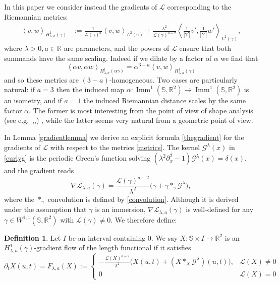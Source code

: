 \documentclass[a4paper,11pt]{amsart}
\theoremstyle{definition}\newtheorem*{definition}{Definition}
\theoremstyle{definition} \newtheorem{proposition}[theorem]{Proposition}
\theoremstyle{definition}\newtheorem{lemma}[theorem]{Lemma}
\theoremstyle{definition}\newtheorem{corollary}[theorem]{Corollary}
\theoremstyle{definition}\newtheorem{example}{Example}
\theoremstyle{remark}\newtheorem*{remark}{Remark}
\newcommand{\IM}{\imm^{1}(\S,\R^2)}
\def\R{\mathbb{R}}
\def\S{\mathbb{S}}
\newcommand{\ip}[1]{{\left \langle {#1} \right \rangle}}
\newcommand{\abs}[1]{\left | {#1}\right |}
\DeclareMathOperator{\imm}{Imm}
\def\length{\mathcal L}
\renewcommand{\L}{\length}
\begin{document}
In this paper we consider instead the gradients of $\length$ corresponding to the Riemannian metrics:
\begin{align}\label{metrics}
\ip{v,w}_{H^1_{\lambda,a}(\gamma)}&:=\frac{1}{\length(\gamma)^{a}}\ip{v,w}_{L^2(\gamma)}+\frac{\lambda^2}{\length(\gamma)^{a-2}} \ip{\tfrac{1}{\abs{\gamma'}} v',\tfrac{1}{\abs{\gamma'}} w'} _{L^2(\gamma)}, 
\end{align}
where $\lambda > 0, a\in\R$ are parameters, and the powers of $\length$ ensure that both summands have the same scaling. Indeed if we dilate by a factor of $\alpha$  we find that 
\[
\ip{\alpha v, \alpha w}_{H^1_{\lambda,a}(\alpha \gamma)}=\alpha^{3-a}\ip{v,w }_{H^1_{\lambda,a}(\gamma)}
\]
and so these metrics are $(3-a)$-homogeneous. Two cases are particularly natural: if $a=3$ then the induced map $\alpha:\IM \to \IM$ is an isometry, and if $a=1$ the induced Riemannian distance scales by the same factor $\alpha$. The former is most interesting from the point of view of shape analysis
(see e.g.~\cite{bauer2024elastic},\cite{bauer2011sobolev},\cite{MR2201275}) , while the latter seems very natural from a geometric point of view.

In Lemma \ref{gradientlemma} we derive an explicit formula \eqref{thegradient} for the gradients of $\L$ with respect to the metrics \eqref{metrics}. The kernel $\mathcal G^\lambda(x)$ in \eqref{curlyg} is the periodic Green's function solving ${(\lambda^2 \partial_x^2-1)\mathcal G^\lambda(x)=\delta(x)}$, and the gradient reads
\[
\nabla\L_{\lambda,a}(\gamma)=\frac{\L(\gamma)^{a-2}}{\lambda^2}\Big(\gamma+\gamma\ast_\gamma \mathcal G^\lambda\Big),
\]
where the $\ast_\gamma$ convolution is defined by \eqref{convolution}. Although it is derived under the assumption that $\gamma$ is an immersion, $\nabla\L_{\lambda,a}(\gamma)$ is well-defined for any $\gamma\in W^{1,1}(\S,\R^2)$ with $\length(\gamma)\neq 0$. We therefore define:


\begin{definition}
Let $I$ be an interval containing $0$.
We say $X:\S\times I\to \R^2$ is an $H^1_{\lambda,a}(\gamma)$-gradient flow of the length functional if it satisfies
\begin{equation}\label{GF}\tag{GFa}
\partial_t X(u,t)=F_{\lambda,a}(X):= 
\begin{cases}
- \frac{\L(X)^{a-2}}{\lambda^2}\Big(X(u,t)+(X\ast_X \mathcal G^\lambda) (u,t)\Big), & \length(X)\neq 0 \\
0 & \length(X)=0
\end{cases}
\end{equation}
\end{definition}
\end{document}
